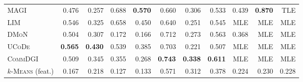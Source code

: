 \documentclass[11pt,a4paper]{article}
\begin{document}
\begin{table}[H]
\begin{tabular*}{\textwidth}{@{\extracolsep{\fill}}l rrrrrrrrrr@{}}
        \textsc{MAGI} & 0.476 & 0.257 & 0.688 & \textbf{0.570} & 0.660 & 0.306 & 0.533 & 0.439 & \textbf{0.870} & TLE \\
        \textsc{LIM} & 0.546 & 0.325 & 0.658 & 0.450 & 0.640 & 0.251 & 0.545 & MLE & MLE & MLE \\
        \textsc{DMoN} & 0.504 & 0.307 & 0.172 & 0.166 & 0.712 & 0.273 & 0.563 & 0.368 & MLE & MLE \\
        \textsc{UCoDe} & \textbf{0.565} & \textbf{0.430} & 0.539 & 0.385 & 0.703 & 0.221 & 0.507 & MLE & MLE & MLE \\
        \textsc{CommDGI} & 0.509 & 0.345 & 0.355 & 0.268 & \textbf{0.743} & \textbf{0.338} & \textbf{0.611} & MLE & MLE & MLE \\
        \midrule
        \textsc{$k$-Means} (feat.) & 0.167 & 0.218 & 0.127 & 0.133 & 0.571 & 0.312 & 0.378 & 0.224 & 0.230 & 0.228 \\
        \bottomrule
    \end{tabular*}
\end{table}
\end{document}

